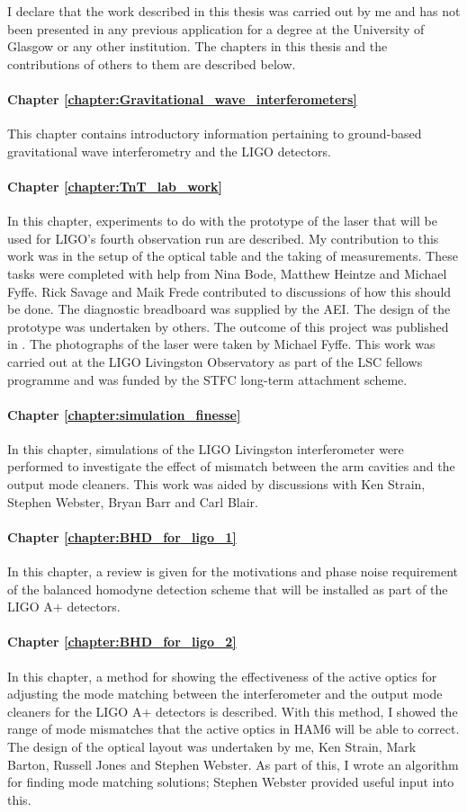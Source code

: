 \setlength{\parskip}{0em}
I declare that the work described in this thesis was carried out by me and has not been presented in any previous application for a degree at the University of Glasgow or any other institution. The chapters in this thesis and the contributions of others to them are described below.
\paragraph{Chapter \ref{chapter:Gravitational_wave_interferometers}}
This chapter contains introductory information pertaining to ground-based gravitational wave interferometry and the LIGO detectors.
\paragraph{Chapter \ref{chapter:TnT_lab_work}} 
In this chapter, experiments to do with the prototype of the laser that will be used for LIGO's fourth observation run are described. My contribution to this work was in the setup of the optical table and the taking of measurements. These tasks were completed with help from Nina Bode, Matthew Heintze and Michael Fyffe. Rick Savage and Maik Frede contributed to discussions of how this should be done. The diagnostic breadboard was supplied by the AEI. The design of the prototype was undertaken by others. The outcome of this project was published in \cite{Bode2020a}. The photographs of the laser were taken by Michael Fyffe. This work was carried out at the LIGO Livingston Observatory as part of the LSC fellows programme and was funded by the STFC long-term attachment scheme.
\paragraph{Chapter \ref{chapter:simulation_finesse}}
In this chapter, simulations of the LIGO Livingston interferometer were performed to investigate the effect of mismatch between the arm cavities and the output mode cleaners. This work was aided by discussions with Ken Strain, Stephen Webster, Bryan Barr and Carl Blair. 
\paragraph{Chapter \ref{chapter:BHD_for_ligo_1}} 
In this chapter, a review is given for the motivations and phase noise requirement of the balanced homodyne detection scheme that will be installed as part of the LIGO A+ detectors.
\paragraph{Chapter \ref{chapter:BHD_for_ligo_2}} 
In this chapter, a method for showing the effectiveness of the active optics for adjusting the mode matching between the interferometer and the output mode cleaners for the LIGO A+ detectors is described. With this method, I showed the range of mode mismatches that the active optics in HAM6 will be able to correct. The design of the optical layout was undertaken by me, Ken Strain, Mark Barton, Russell Jones and Stephen Webster. As part of this, I wrote an algorithm for finding mode matching solutions; Stephen Webster provided useful input into this.
